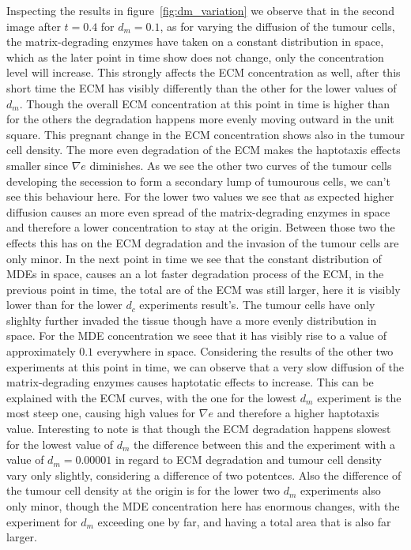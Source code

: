 Inspecting the results in figure~\ref{fig:dm_variation} we observe that in the second image after $t=0.4$ for $d_m=0.1$, as for varying the diffusion of the tumour cells, the matrix-degrading enzymes have taken on a constant distribution in space, which as the later point in time show does not change, only the concentration level will increase. This strongly affects the ECM concentration as well, after this short time the ECM has visibly differently than the other for the lower values of $d_m$. Though the overall ECM concentration at this point in time is higher than for the others the degradation happens more evenly moving outward in the unit square. This pregnant change in the ECM concentration shows also in the tumour cell density. The more even degradation of the ECM makes the haptotaxis effects smaller since $\nabla e$ diminishes. As we see the other two curves of the tumour cells developing the secession to form a secondary lump of tumourous cells, we can't see this behaviour here.
For the lower two values we see that as expected higher diffusion causes an more even spread of the matrix-degrading enzymes in space and therefore a lower concentration to stay at the origin. Between those two the effects this has on the ECM degradation and the invasion of the tumour cells are only minor. \newline 
In the next point in time we see that the constant distribution of MDEs in space, causes an a lot faster degradation process of the ECM, in the previous point in time, the total are of the ECM was still larger, here it is visibly lower than for the lower $d_c$ experiments result's. The tumour cells have only slighlty further invaded the tissue though have a more evenly distribution in space. For the MDE concentration we seee that it has visibly rise to a value of approximately $0.1$ everywhere in space. 
Considering the results of the other two experiments at this point in time, we can observe that a very slow diffusion of the matrix-degrading enzymes causes haptotatic effects to increase. This can be explained with the ECM curves, with the one for the lowest $d_m$ experiment is the most steep one, causing high values for $\nabla e$ and therefore a higher haptotaxis value. Interesting to note is that though the ECM degradation happens slowest for the lowest value of $d_m$ the difference between this and the experiment with a value of $d_m=0.00001$ in regard to ECM degradation and tumour cell density vary only slightly, considering a difference of two potentces. Also the difference of the tumour cell density at the origin is for the lower two $d_m$ experiments also only minor, though the MDE concentration here has enormous changes, with the experiment for $d_m$ exceeding one by far, and having a total area that is also far larger. \newline 
